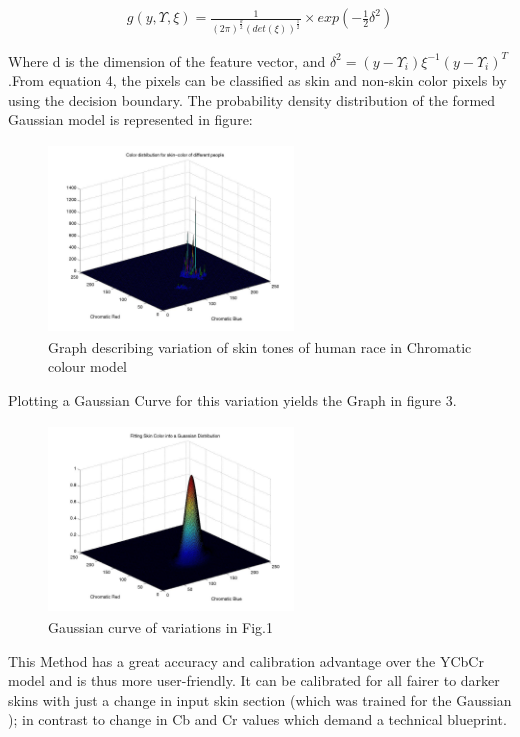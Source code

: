 \documentclass[conference]{IEEEtran}
\begin{document}
\begin{equation}
\begin{aligned}
g(y,\Upsilon,\xi) =  \frac{1}{(2\pi)^{\frac{d}{2}}\left(det\left(\xi \right)\right)^\frac{1}{2}} \times exp(-\frac{1}{2}\delta^2)
\end{aligned}
\end{equation}

Where d is the dimension of the feature vector, and \linebreak
$\delta^2 =(y - \Upsilon_i)\xi^{-1}(y - \Upsilon_i)^T $ .From equation 4, the pixels can be classified as skin and non-skin color pixels by using the decision boundary. The probability density distribution of the formed Gaussian model is represented in figure:
\begin{figure}[h!]
	\centering
	\includegraphics[width = 6.5cm, height = 5cm]{skincolor}
	\caption{ Graph describing variation of skin tones of human race in Chromatic colour model}
\end{figure}
Plotting a Gaussian Curve for this variation yields the Graph in figure 3.
\begin{figure}[h!]
	\centering
	\includegraphics[width = 6.5cm, height = 5cm]{gaussian}
	\caption{Gaussian curve of variations in Fig.1}
\end{figure}

This Method has a great accuracy and calibration advantage over the YCbCr model and is thus more user-friendly. It can be calibrated for all fairer to darker skins with just a change in input skin section (which was trained for the Gaussian ); in contrast to change in Cb and Cr values which demand a technical blueprint.
\end{document}
